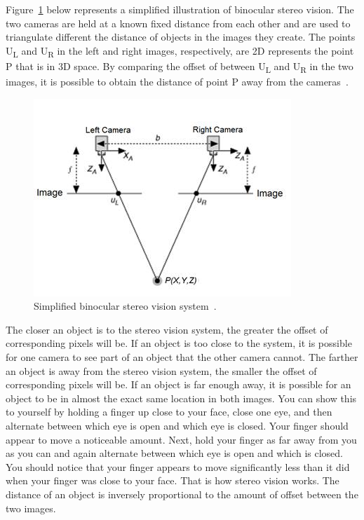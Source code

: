 Figure~\ref{fig:sv_diagram} below represents a simplified illustration of binocular stereo vision. The two cameras are held at a known fixed distance from each other and are used to triangulate different the distance of objects in the images they create. The points U\textsubscript{L} and U\textsubscript{R} in the left and right images, respectively, are 2D represents the point P that is in 3D space. By comparing the offset of between U\textsubscript{L} and U\textsubscript{R} in the two images, it is possible to obtain the distance of point P away from the cameras~\cite{stereoVisionDiagram}.

\begin{figure}
	\begin{center}
		\includegraphics{figures/stereoVisionDiagram.jpg}
		\captionfonts
		\caption{Simplified binocular stereo vision system~\cite{stereoVisionDiagram}.}
		\label{fig:sv_diagram}
	\end{center}
\end{figure}

The closer an object is to the stereo vision system, the greater the offset of corresponding pixels will be. If an object is too close to the system, it is possible for one camera to see part of an object that the other camera cannot. The farther an object is away from the stereo vision system, the smaller the offset of corresponding pixels will be. If an object is far enough away, it is possible for an object to be in almost the exact same location in both images. You can show this to yourself by holding a finger up close to your face, close one eye, and then alternate between which eye is open and which eye is closed. Your finger should appear to move a noticeable amount. Next, hold your finger as far away from you as you can and again alternate between which eye is open and which is closed. You should notice that your finger appears to move significantly less than it did when your finger was close to your face. That is how stereo vision works. The distance of an object is inversely proportional to the amount of offset between the two images.

